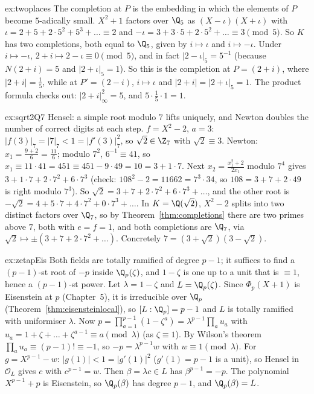 \begin{solution}{ex:twoplaces}
\idea The completion at $P$ is the embedding in which the elements of $P$ become $5$-adically small.
\writeup $X^2+1$ factors over $\Q_5$ as $(X-\iota)(X+\iota)$ with $\iota=2+5+2\cdot5^2+5^3+\dots\equiv2$ and
$-\iota=3+3\cdot5+2\cdot5^2+\dots\equiv3\pmod5$. So $K$ has two completions, both equal to $\Q_5$, given by $i\mapsto\iota$ and $i\mapsto
-\iota$. Under $i\mapsto-\iota$, $2+i\mapsto2-\iota\equiv0\pmod 5$, and in fact $|2-\iota|_5=5^{-1}$ (because $N(2+i)=5$ and
$|2+\iota|_5=1$). So this is the completion at $P=(2+i)$, where $|2+i|=\frac15$, while at $P'=(2-i)$, $i\mapsto\iota$ and
$|2+i|=|2+\iota|_5=1$. The product formula checks out: $|2+i|_\infty^2=5$, and $5\cdot\frac15\cdot1=1$.
\end{solution}

\begin{solution}{ex:sqrt2Q7}
\idea Hensel: a simple root modulo $7$ lifts uniquely, and Newton doubles the number of correct digits at each step.
\writeup $f=X^2-2$, $a=3$: $|f(3)|_7=|7|_7<1=|f'(3)|_7^2$, so $\sqrt2\in\Z_7$ with $\sqrt2\equiv3$. Newton: $x_1=\frac{9+2}{6}=\frac{11}6$;
modulo $7^2$, $6^{-1}\equiv41$, so $x_1\equiv11\cdot41=451\equiv451-9\cdot49=10=3+1\cdot7$. Next $x_2=\frac{x_1^2+2}{2x_1}$ modulo
$7^4$ gives $3+1\cdot7+2\cdot7^2+6\cdot7^3$ (check: $108^2-2=11662=7^3\cdot34$, so $108=3+7+2\cdot49$ is right modulo $7^3$). So
$\sqrt2=3+7+2\cdot7^2+6\cdot7^3+\dots$, and the other root is $-\sqrt2=4+5\cdot7+4\cdot7^2+0\cdot7^3+\dots$. In $K=\Q(\sqrt2)$,
$X^2-2$ splits into two distinct factors over $\Q_7$, so by Theorem~\ref{thm:completions} there are two primes above $7$, both
with $e=f=1$, and both completions are $\Q_7$, via $\sqrt2\mapsto\pm(3+7+2\cdot7^2+\dots)$. Concretely $7=(3+\sqrt2)(3-\sqrt2)$.
\end{solution}

\begin{solution}{ex:zetapEis}
\idea Both fields are totally ramified of degree $p-1$; it suffices to find a $(p-1)$-st root of $-p$ inside $\Q_p(\zeta)$,
and $1-\zeta$ is one up to a unit that is $\equiv1$, hence a $(p-1)$-st power.
\writeup Let $\lambda=1-\zeta$ and $L=\Q_p(\zeta)$. Since $\Phi_p(X+1)$ is Eisenstein at $p$ (Chapter~5), it is irreducible over
$\Q_p$ (Theorem~\ref{thm:eisensteinlocal}), so $[L:\Q_p]=p-1$ and $L$ is totally ramified with uniformiser $\lambda$. Now
$p=\prod_{a=1}^{p-1}(1-\zeta^a)=\lambda^{p-1}\prod_au_a$ with $u_a=1+\zeta+\dots+\zeta^{a-1}\equiv a\pmod\lambda$ (as $\zeta\equiv1$).
By Wilson's theorem $\prod_au_a\equiv(p-1)!\equiv-1$, so $-p=\lambda^{p-1}w$ with $w\equiv1\pmod\lambda$. For $g=X^{p-1}-w$:
$|g(1)|<1=|g'(1)|^2$ ($g'(1)=p-1$ is a unit), so Hensel in $\mathcal O_L$ gives $c$ with $c^{p-1}=w$. Then $\beta=\lambda c\in L$ has
$\beta^{p-1}=-p$. The polynomial $X^{p-1}+p$ is Eisenstein, so $\Q_p(\beta)$ has degree $p-1$, and $\Q_p(\beta)=L$.
\end{solution}

